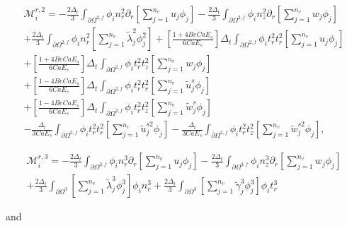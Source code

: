 \documentclass{article}
\begin{document}
\begin{equation}
\begin{array}{l} \mathcal{M}_i^{r,2} = -\frac{2\Delta_t}{3} \int_{\partial \Omega^{2,f}} \phi_i n_r^2 \partial_r \left[ \sum_{j=1}^{n_v} u_j \phi_j \right] - \frac{2\Delta_t}{3} \int_{\partial \Omega^{2,f}} \phi_i n_z^2 \partial_r \left[ \sum_{j=1}^{n_v} w_j \phi_j \right] \\ + \frac{2\Delta_t}{3} \int_{\partial \Omega^{2,f}} \phi_i n_r^2 \left[ \sum_{j=1}^{n_v} \tilde{\lambda}_j^2 \phi_j^2 \right] + \left[ \frac{1 + 4Be Ca E_s}{6Ca E_s} \right] \Delta_t \int_{\partial \Omega^{2,f}} \phi_i t_r^2 t_r^2 \left[ \sum_{j=1}^{n_v} u_j \phi_j \right] \\ + \left[ \frac{1 + 4Be Ca E_s}{6Ca E_s} \right] \Delta_t \int_{\partial \Omega^{2,f}} \phi_i t_r^2 t_z^2 \left[ \sum_{j=1}^{n_v} w_j \phi_j \right] \\ + \left[ \frac{1 - 4Be Ca E_s}{6Ca E_s} \right] \Delta_t \int_{\partial \Omega^{2,f}} \phi_i t_r^2 t_r^2 \left[ \sum_{j=1}^{n_v} \tilde{u}_j^s \phi_j \right] \\ + \left[ \frac{1 - 4Be Ca E_s}{6Ca E_s} \right] \Delta_t \int_{\partial \Omega^{2,f}} \phi_i t_r^2 t_z^2 \left[ \sum_{j=1}^{n_v} \tilde{w}_j^s \phi_j \right] \\ - \frac{\Delta_t}{3Ca E_s} \int_{\partial \Omega^{2,f}} \phi_i t_r^2 t_r^2 \left[ \sum_{j=1}^{n_v} \tilde{u}_j^{s2} \phi_j \right] - \frac{\Delta_t}{3Ca E_s} \int_{\partial \Omega^{2,f}} \phi_i t_r^2 t_z^2 \left[ \sum_{j=1}^{n_v} \tilde{w}_j^{s2} \phi_j \right], \end{array} \tag{4.84}
\end{equation}

\begin{equation}
\begin{array}{l} \mathcal{M}_i^{r,3} = -\frac{2\Delta_t}{3} \int_{\partial \Omega^{3,f}} \phi_i n_r^3 \partial_r \left[ \sum_{j=1}^{n_v} u_j \phi_j \right] - \frac{2\Delta_t}{3} \int_{\partial \Omega^{3,f}} \phi_i n_z^3 \partial_r \left[ \sum_{j=1}^{n_v} w_j \phi_j \right] \\ + \frac{2\Delta_t}{3} \int_{\partial \Omega^{3}} \left[ \sum_{j=1}^{n_v} \tilde{\lambda}_j^3 \phi_j^3 \right] \phi_i n_r^3 + \frac{2\Delta_t}{3} \int_{\partial \Omega^{3}} \left[ \sum_{j=1}^{n_v} \tilde{\gamma}_j^3 \phi_j^3 \right] \phi_i t_r^3 \end{array} \tag{4.85}
\end{equation}

and
\end{document}
